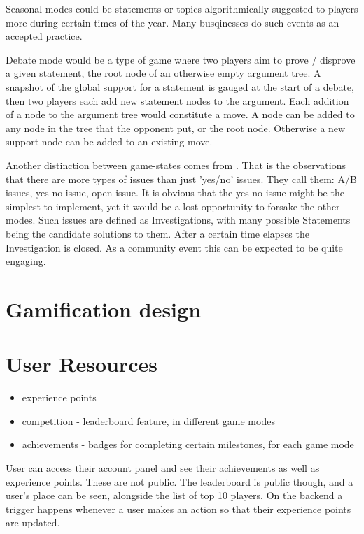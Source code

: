 \documentclass{report}
\begin{document}
Seasonal modes could be statements or topics algorithmically suggested to players more during certain times of the year. Many busqinesses do such events as an accepted practice.

Debate mode would be a type of game where two players aim to prove / disprove a given statement, the root node of an otherwise empty argument tree.  A snapshot of the global support for a statement is gauged at the start of a debate, then two players each add new statement nodes to the argument. Each addition of a node to the argument tree would constitute a move.
A node can be added to any node in the tree that the opponent put, or the root node. Otherwise a new support node can be added to an existing move.

Another distinction between game-states comes from  \cite{rienks_argument_2005}. That is the observations that there are more types of issues than just 'yes/no' issues. They call them: A/B issues, yes-no issue, open issue. It is obvious that the yes-no issue might be the simplest to implement, yet it would be a lost opportunity to forsake the other modes.
Such issues are defined as Investigations, with many possible Statements being the candidate solutions to them. After a certain time elapses the Investigation is closed. As a community event this can be expected to be quite engaging.

\section{Gamification design}

\section{User Resources}
\begin{itemize}
  \item experience points 
  \item competition - leaderboard feature, in different game modes
  \item achievements - badges for completing certain milestones, for each game mode
\end{itemize}

User can access their account panel and see their achievements as well as experience points. These are not public. The leaderboard is public though, and a user's place can be seen, alongside the list of top 10 players. On the backend a trigger happens whenever a user makes an action so that their experience points are updated.
\end{document}

